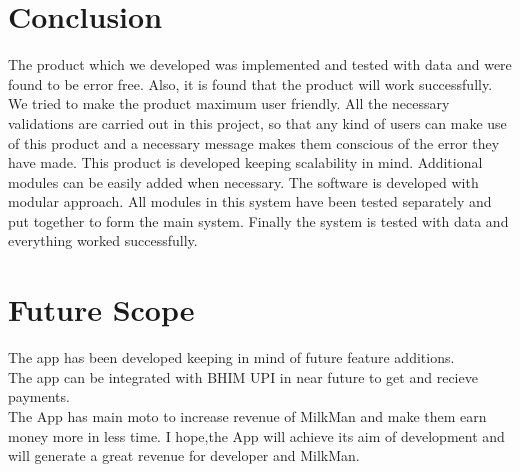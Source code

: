 \section{Conclusion}
The product which we developed was implemented and tested with data and were found to be error free. Also, it is found that the product will work successfully. We tried to make the product maximum user friendly. All the necessary validations are carried out in this project, so that any kind of users can make use of this product and a necessary message makes them conscious of the error they have made. This product is developed keeping scalability in mind. Additional modules can be easily added when necessary. The software is developed with modular approach. All modules in this system have been tested separately and put together to form the main system. Finally the system is tested with data and everything worked successfully.
\section{Future Scope}
The app has been developed keeping in mind of future feature additions.\\
The app can be integrated with BHIM UPI in near future to get and recieve payments.\\
The App has main moto to increase revenue of MilkMan and make them earn money more in less time. I hope,the App will achieve its aim of development and will generate a great revenue for developer and MilkMan.
